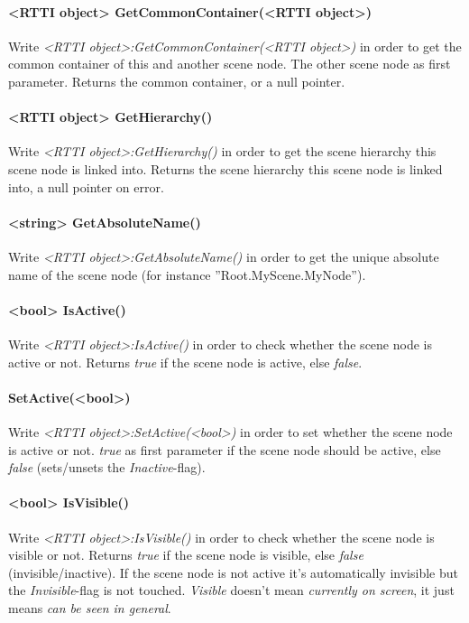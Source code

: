 \paragraph{<RTTI object> GetCommonContainer(<RTTI object>)}
Write \emph{<RTTI object>:GetCommonContainer(<RTTI object>)} in order to get the common container of this and another scene node. The other scene node as first parameter. Returns the common container, or a null pointer.

\paragraph{<RTTI object> GetHierarchy()}
Write \emph{<RTTI object>:GetHierarchy()} in order to get the scene hierarchy this scene node is linked into. Returns the scene hierarchy this scene node is linked into, a null pointer on error.

\paragraph{<string> GetAbsoluteName()}
Write \emph{<RTTI object>:GetAbsoluteName()} in order to get the unique absolute name of the scene node (for instance ''Root.MyScene.MyNode'').

\paragraph{<bool> IsActive()}
Write \emph{<RTTI object>:IsActive()} in order to check whether the scene node is active or not. Returns \emph{true} if the scene node is active, else \emph{false}.

\paragraph{SetActive(<bool>)}
Write \emph{<RTTI object>:SetActive(<bool>)} in order to set whether the scene node is active or not. \emph{true} as first parameter if the scene node should be active, else \emph{false} (sets/unsets the \emph{Inactive}-flag).

\paragraph{<bool> IsVisible()}
Write \emph{<RTTI object>:IsVisible()} in order to check whether the scene node is visible or not. Returns \emph{true} if the scene node is visible, else \emph{false} (invisible/inactive). If the scene node is not active it's automatically invisible but the \emph{Invisible}-flag is not touched. \emph{Visible} doesn't mean \emph{currently on screen}, it just means \emph{can be seen in general}.

